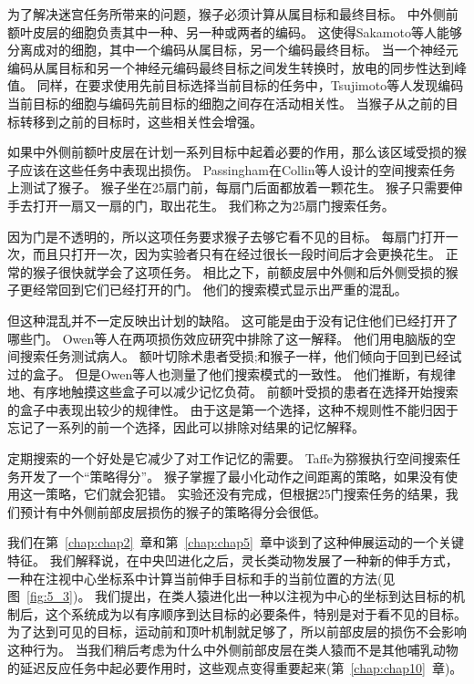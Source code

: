 为了解决迷宫任务所带来的问题，猴子必须计算从属目标和最终目标。
中外侧前额叶皮层的细胞负责其中一种、另一种或两者的编码\cite{saito2005representation}。
这使得Sakamoto等人\cite{sakamoto2008discharge}能够分离成对的细胞，其中一个编码从属目标，另一个编码最终目标。
当一个神经元编码从属目标和另一个神经元编码最终目标之间发生转换时，放电的同步性达到峰值。
同样，在要求使用先前目标选择当前目标的任务中，Tsujimoto等人\cite{tsujimoto2008transient}发现编码当前目标的细胞与编码先前目标的细胞之间存在活动相关性。
当猴子从之前的目标转移到之前的目标时，这些相关性会增强。


如果中外侧前额叶皮层在计划一系列目标中起着必要的作用，那么该区域受损的猴子应该在这些任务中表现出损伤。
Passingham\cite{passingham1985memory}在Collin等人\cite{collin1982role}设计的空间搜索任务上测试了猴子。
猴子坐在25扇门前，每扇门后面都放着一颗花生。
猴子只需要伸手去打开一扇又一扇的门，取出花生。
我们称之为25扇门搜索任务。


因为门是不透明的，所以这项任务要求猴子去够它看不见的目标。
每扇门打开一次，而且只打开一次，因为实验者只有在经过很长一段时间后才会更换花生。
正常的猴子很快就学会了这项任务。
相比之下，前额皮层中外侧和后外侧受损的猴子更经常回到它们已经打开的门。
他们的搜索模式显示出严重的混乱。


但这种混乱并不一定反映出计划的缺陷。
这可能是由于没有记住他们已经打开了哪些门。
Owen等人在两项损伤效应研究中排除了这一解释。
他们用电脑版的空间搜索任务测试病人。
额叶切除术患者受损;和猴子一样，他们倾向于回到已经试过的盒子。
但是Owen等人也测量了他们搜索模式的一致性。
他们推断，有规律地、有序地触摸这些盒子可以减少记忆负荷。
前额叶受损的患者在选择开始搜索的盒子中表现出较少的规律性。
由于这是第一个选择，这种不规则性不能归因于忘记了一系列的前一个选择，因此可以排除对结果的记忆解释。


定期搜索的一个好处是它减少了对工作记忆的需要。
Taffe\cite{taffe2011rhesus}为猕猴执行空间搜索任务开发了一个“策略得分”。
猴子掌握了最小化动作之间距离的策略，如果没有使用这一策略，它们就会犯错。
实验还没有完成，但根据25门搜索任务的结果，我们预计有中外侧前部皮层损伤的猴子的策略得分会很低。


我们在第~\ref{chap:chap2}~章和第~\ref{chap:chap5}~章中谈到了这种伸展运动的一个关键特征。
我们解释说，在中央凹进化之后，灵长类动物发展了一种新的伸手方式，一种在注视中心坐标系中计算当前伸手目标和手的当前位置的方法(见图~\ref{fig:5_3})。
我们提出，在类人猿进化出一种以注视为中心的坐标到达目标的机制后，这个系统成为以有序顺序到达目标的必要条件，特别是对于看不见的目标。
为了达到可见的目标，运动前和顶叶机制就足够了，所以前部皮层的损伤不会影响这种行为。
当我们稍后考虑为什么中外侧前部皮层在类人猿而不是其他哺乳动物的延迟反应任务中起必要作用时，这些观点变得重要起来(第~\ref{chap:chap10}~章)。



